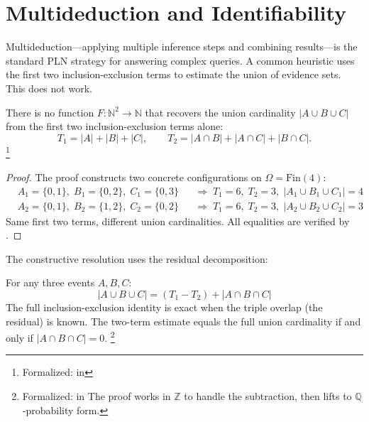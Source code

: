 \documentclass[11pt,openany]{report}
\begin{document}

\section{Multideduction and Identifiability}
\label{sec:multideduction}

Multideduction---applying multiple inference steps and combining
results---is the standard PLN strategy for answering complex queries.
A common heuristic uses the first two inclusion-exclusion terms to
estimate the union of evidence sets.  This does not work.

\begin{theorem}
\label{thm:ie-no-go}
There is no function $F : \mathbb{N}^2 \to \mathbb{N}$ that recovers
the union cardinality $|A \cup B \cup C|$ from the first two
inclusion-exclusion terms alone:
\[
  T_1 = |A| + |B| + |C|, \qquad
  T_2 = |A \cap B| + |A \cap C| + |B \cap C|.
\]%
\footnote{Formalized:
in 
}
\end{theorem}

\begin{proof}[Proof]
The proof constructs two concrete configurations on
$\Omega = \mathrm{Fin}(4)$:
\begin{align*}
  &A_1 = \{0,1\},\; B_1 = \{0,2\},\; C_1 = \{0,3\}
    &&\Longrightarrow\; T_1 = 6,\; T_2 = 3,\; |A_1 \cup B_1 \cup C_1| = 4 \\
  &A_2 = \{0,1\},\; B_2 = \{1,2\},\; C_2 = \{0,2\}
    &&\Longrightarrow\; T_1 = 6,\; T_2 = 3,\; |A_2 \cup B_2 \cup C_2| = 3
\end{align*}
Same first two terms, different union cardinalities.  All equalities
are verified by .
\end{proof}

\noindent
The constructive resolution uses the residual decomposition:

\begin{theorem}
\label{thm:residual-decomp}
For any three events $A, B, C$:
\[
  |A \cup B \cup C| = (T_1 - T_2) + |A \cap B \cap C|
\]
The full inclusion-exclusion identity is exact when the triple
overlap (the residual) is known.  The two-term estimate equals
the full union cardinality if and only if $|A \cap B \cap C| = 0$.%
\footnote{Formalized:
in 
  The proof works in $\mathbb{Z}$ to handle the
subtraction, then lifts to $\mathbb{Q}$-probability form.}
\end{theorem}
\end{document}
